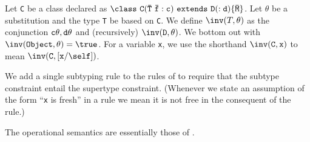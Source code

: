 Let {\tt C} be a class declared as ${\tt \class\ C(\bar{\tt T}\
\bar{\tt f}:c)\ extends\ D(:d)\{\bar{\tt M}\}}$. Let
$\theta$ be a substitution and the type {\tt T} be based on {\tt C}.
We define $\inv(T,\theta)$
as the conjunction ${\tt c\theta,d\theta}$ and (recursively)
$\inv({\tt D},\theta)$.  We bottom out with $\inv({\tt
Object},\theta)=\true$. For a variable {\tt x}, we use the shorthand
$\inv({\tt C},{\tt x})$ to mean $\inv({\tt C},[{\tt x}/\self])$.

We add a single subtyping rule to the rules of \FJ{} to require
that the subtype constraint entail the supertype constraint.
(Whenever we state an assumption of the form ``{\tt x} is
fresh'' in a rule we mean it is not free in the consequent of the
rule.)

The operational semantics are essentially those of \FJ{}.

